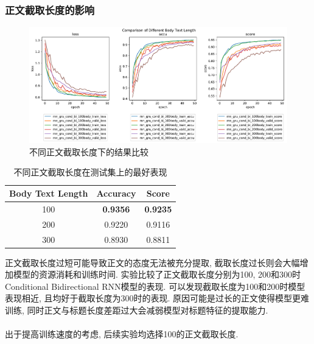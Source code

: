 \documentclass[a4paper]{article}
\begin{document}
	\subsubsection{正文截取长度的影响}
	\begin{figure}[H]
		\centering
		\includegraphics[width=\textwidth]{comparison_of_different_body_text_length.pdf}
		\caption{不同正文截取长度下的结果比较}
		\label{comparison_of_different_body_text_length}
	\end{figure}
	\begin{table}[H]
		\centering
		\caption{不同正文截取长度在测试集上的最好表现}
		\label{lenperf}
		\begin{tabular}{@{}ccc@{}}
			\toprule
			\textbf{Body Text Length}                  & \textbf{Accuracy} & \textbf{Score}  \\ \midrule
			100   & \textbf{0.9356}            & \textbf{0.9235}          \\
			200                 & 0.9220            & 0.9116          \\
			300                & 0.8930 & 0.8811          \\ \bottomrule
		\end{tabular}
	\end{table}
	正文截取长度过短可能导致正文的态度无法被充分提取, 截取长度过长则会大幅增加模型的资源消耗和训练时间. 实验比较了正文截取长度分别为100, 200和300时Conditional Bidirectional RNN模型的表现. 可以发现截取长度为100和200时模型表现相近, 且均好于截取长度为300时的表现. 原因可能是过长的正文使得模型更难训练, 同时正文与标题长度差距过大会减弱模型对标题特征的提取能力.\\\\
	出于提高训练速度的考虑, 后续实验均选择100的正文截取长度.
\end{document}
